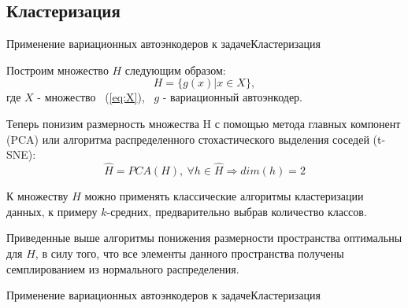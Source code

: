 \documentclass{beamer}
\begin{document}
\subsection{Кластеризация}

\begin{frame}{Применение вариационных автоэнкодеров к задаче}{Кластеризация}

Построим множество $H$ следующим образом:
\begin{equation}\label{eq:H}
H = \{g(x) | x \in X\},
\end{equation}
где $X$ - множество ~(\ref{eq:X}), ~$g$ - вариационный автоэнкодер. \par\medskip
Теперь понизим размерность множества H с помощью метода главных компонент (PCA) или алгоритма распределенного стохастического выделения соседей (t-SNE):
\begin{equation}
	\hat{H} = PCA(H), ~\forall h \in \hat{H} \Rightarrow dim(h) = 2
\end{equation}

К множеству $\hat{H}$ можно применять классические алгоритмы кластеризации данных, к примеру $k$-средних, предварительно выбрав количество классов.


Приведенные выше алгоритмы понижения размерности пространства оптимальны для $H$, в силу того, что все элементы данного пространства получены семплированием из нормального распределения.

\end{frame}

\begin{frame}{Применение вариационных автоэнкодеров к задаче}{Кластеризация}

\begin{figure}[h]
	\label{fig:images_p}
\end{figure}

\end{frame}
\end{document}
